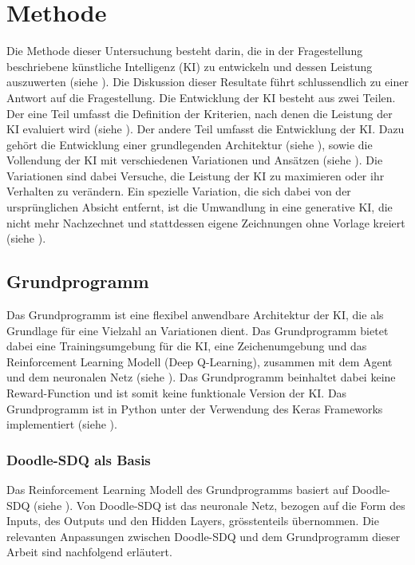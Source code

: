 \chapter{Methode}\label{chap:m} Die Methode dieser Untersuchung besteht darin,
die in der Fragestellung beschriebene künstliche Intelligenz (KI) zu entwickeln
und dessen Leistung auszuwerten (siehe ). Die
Diskussion dieser Resultate führt schlussendlich zu einer Antwort auf die
Fragestellung. Die Entwicklung der KI besteht aus zwei Teilen. Der eine Teil
umfasst die Definition der Kriterien, nach denen die Leistung der KI evaluiert
wird (siehe ). Der andere Teil umfasst die Entwicklung
der KI. Dazu gehört die Entwicklung einer grundlegenden Architektur (siehe
), sowie die Vollendung der KI mit verschiedenen
Variationen und Ansätzen (siehe ). Die Variationen sind
dabei Versuche, die Leistung der KI zu maximieren oder ihr Verhalten zu
verändern. Ein spezielle Variation, die sich dabei von der ursprünglichen
Absicht entfernt, ist die Umwandlung in eine generative KI, die nicht mehr
Nachzechnet und stattdessen eigene Zeichnungen ohne Vorlage kreiert (siehe
).


\section{Grundprogramm}\label{chap:m_grund} Das Grundprogramm ist eine flexibel
anwendbare Architektur der KI, die als Grundlage für eine Vielzahl an
Variationen dient. Das Grundprogramm bietet dabei eine Trainingsumgebung für die
KI, eine Zeichenumgebung und das Reinforcement Learning Modell (Deep
Q-Learning), zusammen mit dem Agent und dem neuronalen Netz (siehe
). Das Grundprogramm beinhaltet dabei keine
Reward-Function und ist somit keine funktionale Version der KI.
Das Grundprogramm ist in Python unter der Verwendung des Keras
Frameworks implementiert (siehe ).


\subsection{Doodle-SDQ als Basis}\label{sub:m_grund_dood} Das Reinforcement
Learning Modell des Grundprogramms basiert auf Doodle-SDQ (siehe
). Von Doodle-SDQ ist das neuronale Netz, bezogen auf
die Form des Inputs, des Outputs und den Hidden Layers, grösstenteils
übernommen. Die relevanten Anpassungen zwischen Doodle-SDQ und dem Grundprogramm
dieser Arbeit sind nachfolgend erläutert.
 

